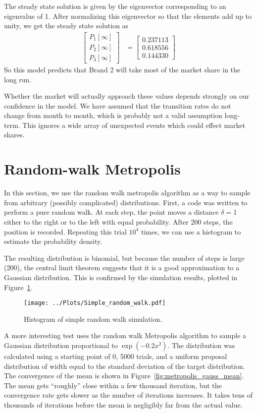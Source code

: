 \documentclass[twocolumn]{myarticle}
\newcommand{\mat}[1]{\begin{bmatrix}#1\end{bmatrix}}
\begin{document}
The steady state solution is given by the eigenvector corresponding to an eigenvalue of 1.
After normalizing this eigenvector so that the elements add up to unity, we get the steady state solution as
\begin{align}
    \mat{P_1[\infty] \\ P_2[\infty] \\ P_3[\infty]} &= \mat{0.237113 \\ 0.618556 \\ 0.144330}
\end{align}
So this model predicts that Brand 2 will take most of the market share in the long run.

Whether the market will actually approach these values depends strongly on our confidence in the model.
We have assumed that the transition rates do not change from month to month, which is probably not a valid assumption long-term.
This ignores a wide array of unexpected events which could effect market shares.

\section{Random-walk Metropolis}
\label{sec:random_walk_metropolis}

In this section, we use the random walk metropolis algorithm as a way to sample from arbitrary (possibly complicated) distributions.
First, a code was written to perform a pure random walk.
At each step, the point moves a distance $ \delta = 1 $ either to the right or to the left with equal probability.
After 200 steps, the position is recorded.
Repeating this trial $ 10^4 $ times, we can use a histogram to estimate the probability density.

The resulting distribution is binomial, but because the number of steps is large (200), the central limit theorem suggests that it is a good approximation to a Gaussian distribution.
This is confirmed by the simulation results, plotted in Figure~\ref{fig:simple_random_walk}.

\begin{figure}[ht!]
    \begin{center}
    \texttt{[image: ../Plots/Simple\_random\_walk.pdf]}
    \caption{%
        Histogram of simple random walk simulation.
    }
    \label{fig:simple_random_walk}
    \end{center}
\end{figure}

A more interesting test uses the random walk Metropolis algorithm to sample a Gaussian distribution proportional to $ \exp(-0.2x^2) $.
The distribution was calculated using a starting point of 0, 5000 trials, and a uniform proposal distribution of width equal to the standard deviation of the target distribution.
The convergence of the mean is shown in Figure~\ref{fig:metropolis_gauss_mean}.
The mean gets ``roughly'' close within a few thousand iteration, but the convergence rate gets slower as the number of iterations increases.
It takes tens of thousands of iterations before the mean is negligibly far from the actual value.
\end{document}
